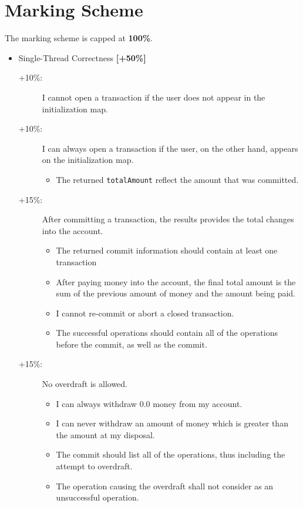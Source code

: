 \documentclass{article}
\begin{document}
	\section*{Marking Scheme}
	The marking scheme is capped at  \textbf{100\%}.
	\begin{itemize}
		\item Single-Thread Correctness \textbf{[+50\%]}
			\begin{description}
			\item [+10\%:] I cannot open a transaction if the user does not appear in the initialization map.
			\item [+10\%:] I can always open a transaction if the user, on the other hand, appears on the initialization map.
			\begin{itemize}
				\item The returned \texttt{totalAmount} reflect the amount that was committed.
			\end{itemize}
			\item [+15\%:] After committing a transaction, the results provides the total changes into the account.
			\begin{itemize}
				\item The returned commit information should contain at least one transaction
				\item After paying money into the account, the final total amount is the sum of the previous amount of money and the amount being paid.
				\item I cannot re-commit or abort a closed transaction.
				\item The successful operations should contain all of the operations before the commit, as well as the commit.
			\end{itemize}
			\item [+15\%: ] No overdraft is allowed.
			\begin{itemize}
				\item I can always withdraw $0.0$ money from my account.
				\item I can never withdraw an amount of money which is greater than the amount at my disposal.
				\item The commit should list all of the operations, thus including the attempt to overdraft.
				\item The operation causing the overdraft shall not consider as an unsuccessful operation.
			\end{itemize}
	
		\end{description}



\end{itemize}
\end{document}
